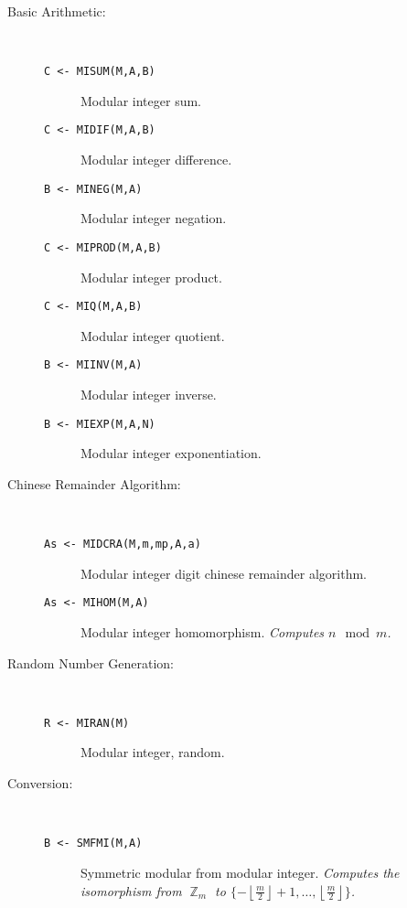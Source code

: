 \begin{description}
\item[Basic Arithmetic:] \ \
  \begin{description}
  \item[{\tt C <- MISUM(M,A,B) 
}]  Modular integer sum.
  \item[{\tt C <- MIDIF(M,A,B) 
}]  Modular integer difference.
  \item[{\tt B <- MINEG(M,A) 
}]  Modular integer negation.
  \item[{\tt C <- MIPROD(M,A,B) 
}]  Modular integer product.
  \item[{\tt C <- MIQ(M,A,B) 
}]  Modular integer quotient.
  \item[{\tt B <- MIINV(M,A) 
}]  Modular integer inverse.
  \item[{\tt B <- MIEXP(M,A,N) 
}]  Modular integer exponentiation.
  \end{description}

\item[Chinese Remainder Algorithm:] \ \
  \begin{description}
  \item[{\tt As <- MIDCRA(M,m,mp,A,a) 
}]  Modular integer digit chinese remainder algorithm.
  \item[{\tt As <- MIHOM(M,A) 
}]\index{MIHOM}  Modular integer homomorphism. {\em Computes $n \mod m$.}
  \end{description}

\item[Random Number Generation:] \ \
  \begin{description}
  \item[{\tt R <- MIRAN(M) 
}]\index{MIRAN}  Modular integer, random.
  \end{description}

\item[Conversion:] \ \
  \begin{description}
  \item[{\tt B <- SMFMI(M,A) 
}]  Symmetric modular from modular integer. {\em Computes the
  isomorphism from $\BbbZ_m$ to $\{-\left\lfloor\frac{m}{2}\right\rfloor+1,
  \ldots, \left\lfloor\frac{m}{2}\right\rfloor\}$.}
  \end{description}

\end{description}

